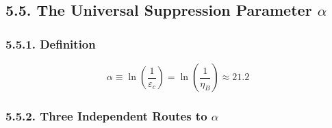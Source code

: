 \documentclass[
  11pt,
]{article}
\begin{document}
\hypertarget{the-universal-suppression-parameter-alpha}{%
\subsection{\texorpdfstring{5.5. The Universal Suppression Parameter
\(\alpha\)}{5.5. The Universal Suppression Parameter \textbackslash alpha}}\label{the-universal-suppression-parameter-alpha}}

\hypertarget{definition}{%
\subsubsection{5.5.1. Definition}\label{definition}}

\[\alpha \equiv \ln\!\left(\frac{1}{\varepsilon_c}\right) = \ln\!\left(\frac{1}{\eta_B}\right) \approx 21.2 \tag{241}\]

\hypertarget{three-independent-routes-to-alpha-1}{%
\subsubsection{\texorpdfstring{5.5.2. Three Independent Routes to
\(\alpha\)}{5.5.2. Three Independent Routes to \textbackslash alpha}}\label{three-independent-routes-to-alpha-1}}
\end{document}
